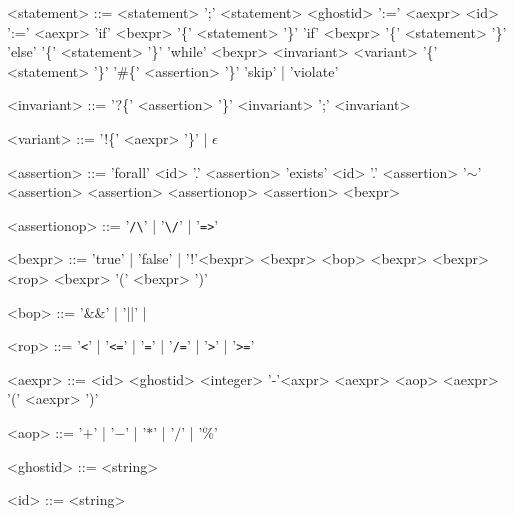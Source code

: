 \begin{grammar}
<statement> ::= <statement> ';' <statement>
\alt <ghostid> ':=' <aexpr>
\alt <id> ':=' <aexpr>
\alt 'if' <bexpr> '\{' <statement> '\}'
\alt 'if' <bexpr> '\{' <statement> '\}' 'else' '\{' <statement> '\}'
\alt 'while' <bexpr> <invariant> <variant> '\{' <statement> '\}'
\alt '\#\{' <assertion> '\}'
\alt 'skip' | 'violate'

<invariant> ::= '?\{' <assertion> '\}'
\alt <invariant> ';' <invariant>

<variant> ::= '!\{' <aexpr> '\}' | $\epsilon$

<assertion> ::= 'forall' <id> '.' <assertion>
\alt 'exists' <id> '.' <assertion>
\alt '$\sim$' <assertion>
\alt <assertion> <assertionop> <assertion>
\alt <bexpr>

<assertionop> ::= '\verb|/\|' | '\verb|\/|' | '\verb|=>|'

<bexpr> ::= 'true' | 'false' | \alt '!'<bexpr>
\alt <bexpr> <bop> <bexpr>
\alt <bexpr> <rop> <bexpr>
\alt '(' <bexpr> ')'

<bop> ::= '\&\&' | '||' |

<rop> ::= '\verb|<|' | '\verb|<=|' | '\verb|=|' | '\verb|/=|' | '\verb|>|' | '\verb|>=|'

<aexpr> ::= <id>
\alt <ghostid>
\alt <integer>
\alt '-'<axpr>
\alt <aexpr> <aop> <aexpr>
\alt '(' <aexpr> ')'

<aop> ::= '$+$' | '$-$' | '$*$' | '$/$' | '\%'

<ghostid> ::=  <string>

<id> ::= <string>
\end{grammar}
